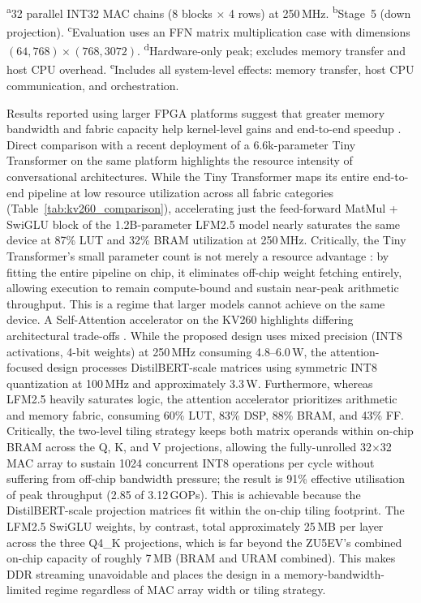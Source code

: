 \documentclass[manuscript,]{acmart} %
\begin{document}
\begin{table}[H]
\par\vspace{4pt}
{\footnotesize
\textsuperscript{a}32 parallel INT32 MAC chains (8 blocks $\times$ 4 rows) at 250\,MHz.
\textsuperscript{b}Stage~5 (down projection).
\textsuperscript{c}Evaluation uses an FFN matrix multiplication case with dimensions $(64,768)\times(768,3072)$.
\textsuperscript{d}Hardware-only peak; excludes memory transfer and host CPU overhead.
\textsuperscript{e}Includes all system-level effects: memory transfer, host CPU communication, and orchestration.}

\end{table}

Results reported using larger FPGA platforms suggest that greater memory bandwidth and fabric capacity help kernel-level gains and end-to-end speedup \cite{FTRANS}.
Direct comparison with a recent deployment of a 6.6k-parameter Tiny Transformer on the same platform highlights the resource intensity of conversational architectures. While the Tiny Transformer maps its entire end-to-end pipeline at low resource utilization across all fabric categories (Table~\ref{tab:kv260_comparison}), accelerating just the feed-forward MatMul + SwiGLU block of the 1.2B-parameter LFM2.5 model nearly saturates the same device at 87\% LUT and 32\% BRAM utilization at 250\,MHz. Critically, the Tiny Transformer's small parameter count is not merely a resource advantage \cite{11310944tin}: by fitting the entire pipeline on chip, it eliminates off-chip weight fetching entirely, allowing execution to remain compute-bound and sustain near-peak arithmetic throughput. This is a regime that larger models cannot achieve on the same device.
A Self-Attention accelerator on the KV260 highlights differing architectural trade-offs \cite{li2025fpgabasedhardware}. While the proposed design uses mixed precision (INT8 activations, 4-bit weights) at 250\,MHz consuming 4.8--6.0\,W, the attention-focused design processes DistilBERT-scale matrices using symmetric INT8 quantization at 100\,MHz and approximately 3.3\,W. Furthermore, whereas LFM2.5 heavily saturates logic, the attention accelerator prioritizes arithmetic and memory fabric, consuming 60\% LUT, 83\% DSP, 88\% BRAM, and 43\% FF. Critically, the two-level tiling strategy keeps both matrix operands within on-chip BRAM across the Q, K, and V projections, allowing the fully-unrolled 32$\times$32 MAC array to sustain 1024 concurrent INT8 operations per cycle without suffering from off-chip bandwidth pressure; the result is 91\% effective utilisation of peak throughput (2.85 of 3.12\,GOPs). This is achievable because the DistilBERT-scale projection matrices fit within the on-chip tiling footprint. The LFM2.5 SwiGLU weights, by contrast, total approximately 25\,MB per layer across the three Q4\_K projections, which is far beyond the ZU5EV's combined on-chip capacity of roughly 7\,MB (BRAM and URAM combined). This makes DDR streaming unavoidable and places the design in a memory-bandwidth-limited regime regardless of MAC array width or tiling strategy.
\end{document}
